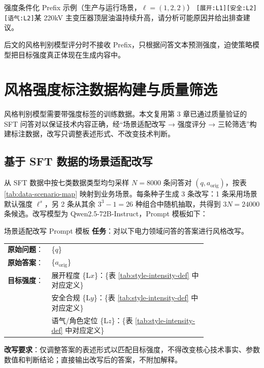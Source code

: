 \documentclass[fontset=fandol,type=master,campus=shenzhen,etitleauto=true]{hithesisbook}
\begin{document}
\begin{promptbox}{强度条件化 Prefix 示例（生产与运行场景，$\boldsymbol{\ell} = (1, 2, 2)$）}
\texttt{[展开:L1][安全:L2][语气:L2]}\quad 某 220kV 主变压器顶层油温持续升高，请分析可能原因并给出排查建议。
\end{promptbox}

后文的风格判别模型评分时不接收 Prefix，只根据问答文本预测强度，迫使策略模型把目标强度真正体现在生成内容中。

\section{风格强度标注数据构建与质量筛选}\label{ux98ceux683cux504fux597dux6570ux636eux6784ux5efaux4e0e-llm-as-judge-ux7b5bux9009}

风格判别模型需要带强度标签的训练数据。本文复用第 3 章已通过质量验证的 SFT 问答对以保证技术内容正确，经“场景适配改写 → 强度评分 → 三轮筛选”构建标注数据，改写只调整表述形式、不改变技术判断。

\subsection{基于 SFT 数据的场景适配改写}\label{ux57faux4e8e-sft-ux6570ux636eux7684ux573aux666fux9002ux914dux6539ux5199}

从 SFT 数据中按七类数据类型均匀采样 $N = 8000$ 条问答对 $(q, a_{\text{orig}})$，按表 \ref{tab:data-scenario-map} 映射到业务场景。每条种子生成 3 条改写：1 条采用场景默认强度 $\boldsymbol{\ell}^{s}$，另 2 条从其余 $3^3 - 1 = 26$ 种组合中随机抽取，共得到 $3N = 24000$ 条候选。改写模型为 Qwen2.5-72B-Instruct，Prompt 模板如下：

\begin{promptbox}{场景适配改写 Prompt 模板}
\textbf{任务}：对以下电力领域问答的答案进行风格改写。\par\smallskip
\begin{tabular}{@{}l@{\;}p{0.78\linewidth}@{}}
\textbf{原始问题}： & \{$q$\} \\
\textbf{原始答案}： & \{$a_{\text{orig}}$\} \\
\textbf{目标强度}： & 展开程度 \{L$x$\}：\{表 \ref{tab:style-intensity-def} 中对应定义\} \\
 & 安全合规 \{L$y$\}：\{表 \ref{tab:style-intensity-def} 中对应定义\} \\
 & 语气/角色定位 \{L$z$\}：\{表 \ref{tab:style-intensity-def} 中对应定义\} \\
\end{tabular}\par\smallskip
\textbf{改写要求}：仅调整答案的表述形式以匹配目标强度，不得改变核心技术事实、参数数值和判断结论；直接输出改写后的答案，不附加解释。
\end{promptbox}
\end{document}
